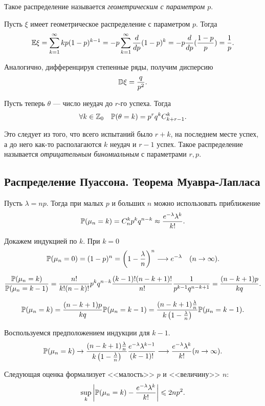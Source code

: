 \documentclass[../TV&MS.tex]{subfiles}
\begin{document}
	Такое распределение называется \emph{геометрическим с параметром $p$}.

	Пусть $\xi$ имеет геометрическое распределение с параметром $p$. Тогда
	$$\mathbb{E}\xi = \sum\limits_{k = 1}^{\infty}kp(1-p)^{k-1} = -p\sum\limits_{k = 1}^{\infty}\frac{d}{dp}(1-p)^k 
	= -p \frac{d}{dp}(\frac{1-p}{p}) = \frac1{p}.$$

	Аналогично, дифференцируя степенные ряды, получим дисперсию
	$$\mathbb{D}\xi = \frac{q}{p^2}.$$

	Пусть теперь $\theta$ --- число неудач до $r$-го успеха. Тогда
	$$\forall k \in\mathbb{Z}_0 \quad \mathbb{P}(\theta = k) = p^rq^kC_{k+r-1}^{k}.$$
	
	Это следует из того, что всего испытаний было $r+k$, на последнем месте успех, 
	а до него как-то располагаются $k$ неудач и $r-1$ успех. Такое распределение 
	называется \emph{отрицательным биномиальным} с параметрами $r, p$.


\subsection{Распределение Пуассона. Теорема Муавра-Лапласа}

\begin{Th} [Пуассон]
	Пусть $\lambda = np$. Тогда при малых $p$ и больших $n$ можно использовать приближение
	$$\mathbb{P}(\mu_n = k) = C_n^kp^kq^{n-k} \approx \frac{e^{-\lambda}\lambda^k}{k!}.$$
\end{Th}
\begin{Proof}
	Докажем индукцией по $k$. При $k = 0$
	$$\mathbb{P}(\mu_n = 0) = (1-p)^n = \left(1 - \frac{\lambda}{n}\right)^n 
	\longrightarrow e^{-\lambda} \quad (n \to \infty).$$
	
	$$\frac{\mathbb{P}(\mu_n = k)}{\mathbb{P}(\mu_n = k-1)} = \frac{n!}{k!(n-k)!}p^kq^{n-k} 
	\frac{(k-1)!(n-k+1)!}{n!} \frac{1}{p^{k-1}q^{n-k+1}} = \frac{(n-k+1)p}{kq}.$$

	$$\mathbb{P}(\mu_n = k) = \frac{(n-k+1)p}{kq}\mathbb{P}(\mu_n = k-1) = 
	\frac{(n-k+1)\frac{\lambda}n}{k\left(1-\frac{\lambda}n\right)}\mathbb{P}(\mu_n = k-1).$$

	Воспользуемся предположением индукции для $k-1$.
	$$\mathbb{P}(\mu_n = k) \to \frac{(n-k+1)\frac{\lambda}n}{k\left(1-\frac{\lambda}n\right)} 
	\frac{e^{-\lambda}\lambda^{k-1}}{(k-1)!} \longrightarrow \frac{e^{-\lambda}\lambda^{k}}{k!} 
	(n \to \infty).$$
\end{Proof}

	Следующая оценка формализует <<малость>> $p$ и <<величину>> $n$:
	$$\sup\limits_k \left|\mathbb{P}(\mu_n = k) - \frac{e^{-\lambda}\lambda^k}{k!}\right| 
	\leqslant 2np^2.$$
	
\end{document}
